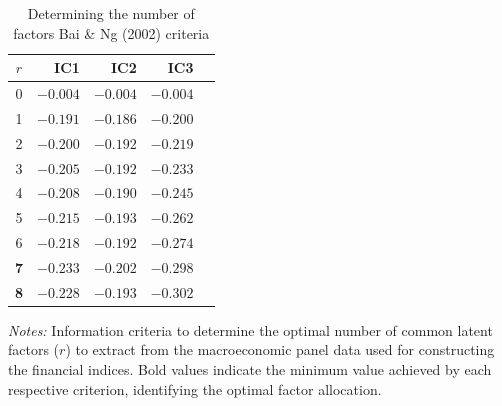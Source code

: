 \documentclass[12pt]{article}
\begin{document}
\begin{table}[h]
\centering
\begin{threeparttable}
\caption{Determining the number of factors Bai \& Ng (2002) criteria}\label{tab:bai-ng-crit}
\begin{tabular}{crrrr}
\hline
$r$ & \textbf{IC1} & \textbf{IC2} & \textbf{IC3} \\
\hline
0 & $-0.004$ & $-0.004$ & $-0.004$ \\
1 & $-0.191$ & $-0.186$ & $-0.200$ \\
2 & $-0.200$ & $-0.192$ & $-0.219$ \\
3 & $-0.205$ & $-0.192$ & $-0.233$ \\
4 & $-0.208$ & $-0.190$ & $-0.245$ \\
5 & $-0.215$ & $-0.193$ & $-0.262$ \\
6 & $-0.218$ & $-0.192$ & $-0.274$ \\
\textbf{7} & $\mathbf{-0.233}$ & $\mathbf{-0.202}$ & $-0.298$ \\
\textbf{8} & $-0.228$ & $-0.193$ & $\mathbf{-0.302}$ \\
\hline
\end{tabular}
\begin{tablenotes}
    \small
    \item \textit{Notes:} Information criteria to determine the optimal number of common latent factors ($r$) to extract from the macroeconomic panel data used for constructing the financial indices. Bold values indicate the minimum value achieved by each respective criterion, identifying the optimal factor allocation. %
\end{tablenotes}
\end{threeparttable}
\end{table}
\end{document}
